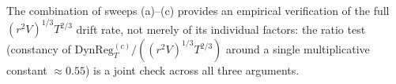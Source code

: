 \documentclass[11pt]{article}
\newcommand{\DynReg}{\mathrm{DynReg}}
\begin{document}
The combination of sweeps (a)--(c) provides an empirical verification of the
full $(r^{2}V)^{1/3}T^{2/3}$ drift rate, not merely of its individual
factors: the ratio test (constancy of $\DynReg_T^{(c)}/((r^2V)^{1/3}T^{2/3})$
around a single multiplicative constant $\approx 0.55$) is a joint check
across all three arguments.




\end{document}
